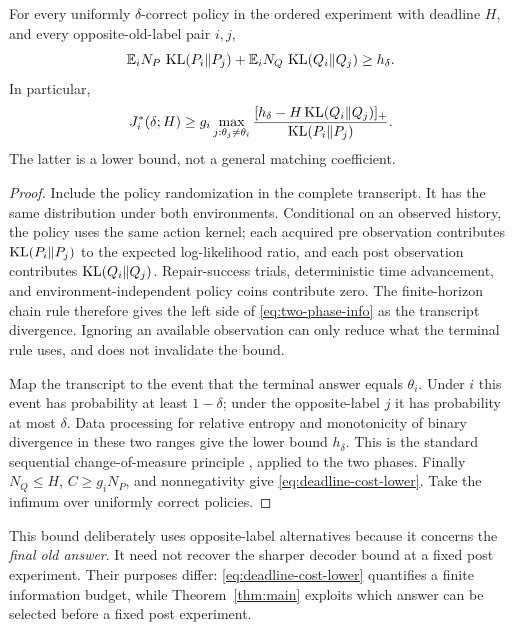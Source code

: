 \begin{theorem}
\label{thm:deadline-lower}
For every uniformly $\delta$-correct policy in the ordered experiment with
deadline $H$, and every opposite-old-label pair $i,j$,
\begin{equation}
\mathbb E_iN_P\,\operatorname{KL}(P_i\Vert P_j)
+\mathbb E_iN_Q\,\operatorname{KL}(Q_i\Vert Q_j)\ge h_\delta.
\label{eq:two-phase-info}
\end{equation}
In particular,
\begin{equation}
J_i^*(\delta;H)\ge
g_i\max_{j:\theta_j\ne\theta_i}
\frac{[h_\delta-H\operatorname{KL}(Q_i\Vert Q_j)]_+}
     {\operatorname{KL}(P_i\Vert P_j)}.
\label{eq:deadline-cost-lower}
\end{equation}
The latter is a lower bound, not a general matching coefficient.
\end{theorem}
\begin{proof}
Include the policy randomization in the complete transcript. It has the same
distribution under both environments. Conditional on an observed history,
the policy uses the same action kernel; each acquired pre observation
contributes $\operatorname{KL}(P_i\Vert P_j)$ to the expected log-likelihood ratio, and each
post observation contributes $\operatorname{KL}(Q_i\Vert Q_j)$. Repair-success trials,
deterministic time advancement, and environment-independent policy coins
contribute zero. The finite-horizon chain rule therefore gives the left side
of \eqref{eq:two-phase-info} as the transcript divergence. Ignoring an available
observation can only reduce what the terminal rule uses, and does not
invalidate the bound.

Map the transcript to the event that the terminal answer equals $\theta_i$.
Under $i$ this event has probability at least $1-\delta$; under the
opposite-label $j$ it has probability at most $\delta$. Data processing for
relative entropy and monotonicity of binary divergence in these two ranges
give the lower bound $h_\delta$. This is the standard sequential
change-of-measure principle \citep{kaufmann2016}, applied to the two phases.
Finally $N_Q\le H$, $C\ge g_iN_P$, and nonnegativity give
\eqref{eq:deadline-cost-lower}. Take the infimum over uniformly correct
policies.
\end{proof}
This bound deliberately uses opposite-label alternatives because it concerns
the \emph{final old answer}. It need not recover the sharper decoder bound at
a fixed post experiment. Their purposes differ: \eqref{eq:deadline-cost-lower}
quantifies a finite information budget, while Theorem~\ref{thm:main} exploits
which answer can be selected before a fixed post experiment.

